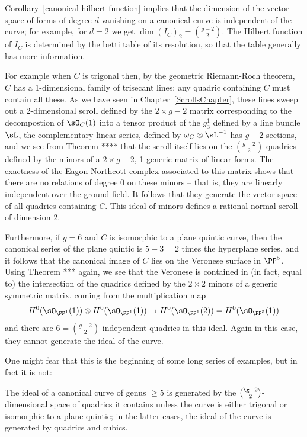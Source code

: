 Corollary~\ref{canonical hilbert function} implies that the dimension of the vector space of forms of degree $d$
vanishing on a canonical curve is independent of the curve; for example, for $d=2$ we get
$
\dim ({I_{C}})_{2} = {g-2\choose 2}.
$
The Hilbert function of $I_C$ is determined by the betti table of its resolution, so that the table generally has more information.

 For example
when $C$ is trigonal then, by the geometric Riemann-Roch theorem, $C$ has a 1-dimensional family of trisecant lines; any quadric containing $C$ must contain all these. As we have seen in Chapter~\ref{ScrollsChapter}, these lines sweep
out a 2-dimensional scroll defined by the $2\times g-2$ matrix corresponding to the decompostion of $\sO_C(1)$
into a tensor product of the $g^{1}_{3}$ defined by a line bundle $\sL$, the complementary linear series,
defined by $\omega_{C}\otimes \sL^{-1}$ has $g-2$ sections, and we see from Theorem ****
that the scroll itself lies on the ${g-2\choose 2}$ quadrics defined by the minors of a $2\times g-2$, 1-generic matrix of linear forms. The exactness of the Eagon-Northcott complex associated to this matrix shows that there are no relations of degree 0 on these minors -- that is, they are linearly independent over the ground field. It follows that they generate the vector space of all quadrics containing $C$. This
ideal of minors defines a rational normal scroll of dimension 2.

Furthermore, if $g = 6$ and $C$ is isomorphic to a plane quintic curve, then the canonical series of the plane quintic is $5-3 = 2$ times the hyperplane series, and it follows that the canonical image of $C$ lies on the Veronese surface in $\PP^{5}$. Using Theorem *** again, we see that the Veronese is contained in (in fact, equal to) the intersection of the quadrics defined by the $2\times 2$ minors of a generic symmetric matrix, coming from the 
multiplication map 
$$
H^{0}(\sO_{\PP^{1}}(1))\otimes H^{0}(\sO_{\PP^{1}}(1)) \to H^{0}(\sO_{\PP^{1}}(2)) = H^{0}(\sO_{\PP^{5}}(1))
$$
and there are $6 = {g-2\choose 2}$ independent quadrics in this ideal. Again in this case, they cannot generate the ideal of the curve.

One might fear that this is the beginning of some long series of examples, but in fact it is not: 

\begin{theorem} [Petri]
The ideal of a canonical curve of genus $\geq 5$ is generated by the $\g-2\choose 2$-dimensional space of quadrics it contains unless the curve is either trigonal or isomorphic to a plane quintic; in the latter cases, the ideal of the curve is generated by quadrics and cubics.
\end{theorem}

